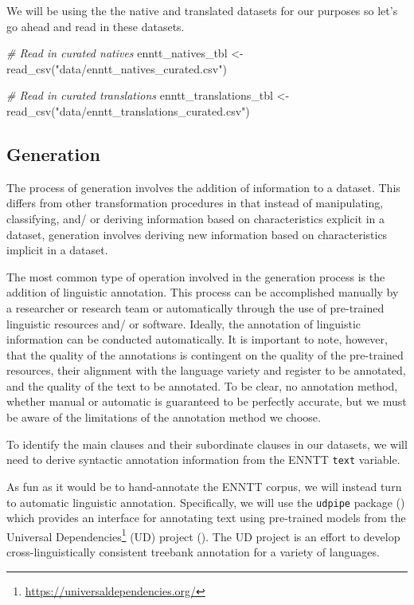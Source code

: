 \documentclass[
  letterpaper,
]{latex/krantz}
\newenvironment{Shaded}{\begin{snugshade}}{\end{snugshade}}
\newcommand{\CommentTok}[1]{\textcolor[rgb]{0.00,0.00,0.00}{\textit{#1}}}
\newcommand{\FunctionTok}[1]{\textcolor[rgb]{0.00,0.00,0.00}{#1}}
\newcommand{\NormalTok}[1]{\textcolor[rgb]{0.00,0.00,0.00}{#1}}
\newcommand{\OtherTok}[1]{\textcolor[rgb]{0.00,0.00,0.00}{#1}}
\newcommand{\StringTok}[1]{\textcolor[rgb]{0.00,0.00,0.00}{#1}}
\theoremstyle{definition}
\theoremstyle{remark}
\DeclareRobustCommand{\href}[2]{#2\footnote{\url{#1}}}
\begin{document}
We will be using the the native and translated datasets for our purposes
so let's go ahead and read in these datasets.

\begin{Shaded}
\begin{Highlighting}[]
\CommentTok{\# Read in curated natives}
\NormalTok{enntt\_natives\_tbl }\OtherTok{\textless{}{-}}
  \FunctionTok{read\_csv}\NormalTok{(}\StringTok{"data/enntt\_natives\_curated.csv"}\NormalTok{)}

\CommentTok{\# Read in curated translations}
\NormalTok{enntt\_translations\_tbl }\OtherTok{\textless{}{-}}
  \FunctionTok{read\_csv}\NormalTok{(}\StringTok{"data/enntt\_translations\_curated.csv"}\NormalTok{)}
\end{Highlighting}
\end{Shaded}

\subsection{Generation}\label{sec-td-generation}

The process of generation involves the addition of information to a
dataset. This differs from other transformation procedures in that
instead of manipulating, classifying, and/ or deriving information based
on characteristics explicit in a dataset, generation involves deriving
new information based on characteristics implicit in a dataset.

The most common type of operation involved in the generation process is
the addition of linguistic annotation. This process can be accomplished
manually by a researcher or research team or automatically through the
use of pre-trained linguistic resources and/ or software. Ideally, the
annotation of linguistic information can be conducted automatically. It
is important to note, however, that the quality of the annotations is
contingent on the quality of the pre-trained resources, their alignment
with the language variety and register to be annotated, and the quality
of the text to be annotated. To be clear, no annotation method, whether
manual or automatic is guaranteed to be perfectly accurate, but we must
be aware of the limitations of the annotation method we choose.

To identify the main clauses and their subordinate clauses in our
datasets, we will need to derive syntactic annotation information from
the ENNTT \texttt{text} variable.

As fun as it would be to hand-annotate the ENNTT corpus, we will instead
turn to automatic linguistic annotation. Specifically, we will use the
\texttt{udpipe} package () which
provides an interface for annotating text using pre-trained models from
the \href{https://universaldependencies.org/}{Universal Dependencies}
(UD) project (). The UD
project is an effort to develop cross-linguistically consistent treebank
annotation for a variety of languages.
\end{document}
